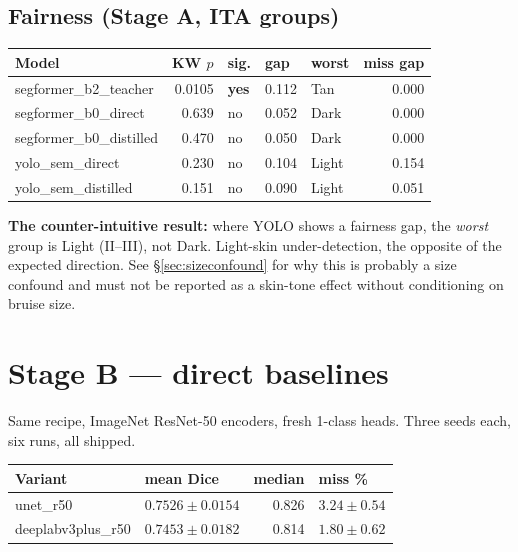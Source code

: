 \documentclass[11pt]{article}
\begin{document}
\subsection{Fairness (Stage A, ITA groups)}

\begin{center}
\begin{tabular}{Lnlllr}
\toprule
\textbf{Model} & \textbf{KW $p$} & \textbf{sig.} & \textbf{gap} & \textbf{worst} & \textbf{miss gap} \\
\midrule
segformer\_b2\_teacher & 0.0105 & \textbf{yes} & 0.112 & Tan & 0.000 \\
segformer\_b0\_direct & 0.639 & no & 0.052 & Dark & 0.000 \\
segformer\_b0\_distilled & 0.470 & no & 0.050 & Dark & 0.000 \\
yolo\_sem\_direct & 0.230 & no & 0.104 & Light & 0.154 \\
yolo\_sem\_distilled & 0.151 & no & 0.090 & Light & 0.051 \\
\bottomrule
\end{tabular}
\end{center}

\textbf{The counter-intuitive result:} where YOLO shows a fairness gap, the
\emph{worst} group is Light (II--III), not Dark. Light-skin under-detection, the
opposite of the expected direction. See \S\ref{sec:sizeconfound} for why this is
probably a size confound and must not be reported as a skin-tone effect without
conditioning on bruise size.

\section{Stage B --- direct baselines}

Same recipe, ImageNet ResNet-50 encoders, fresh 1-class heads. Three seeds each,
six runs, all shipped.

\begin{center}
\begin{tabular}{LMnM}
\toprule
\textbf{Variant} & \textbf{mean Dice} & \textbf{median} & \textbf{miss \%} \\
\midrule
unet\_r50 & $0.7526\pm0.0154$ & 0.826 & $3.24\pm0.54$ \\
deeplabv3plus\_r50 & $0.7453\pm0.0182$ & 0.814 & $1.80\pm0.62$ \\
\bottomrule
\end{tabular}
\end{center}
\end{document}
